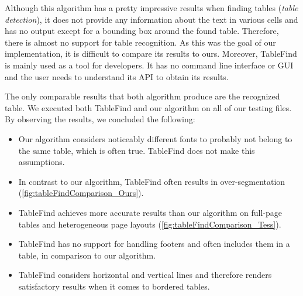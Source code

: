 Although this algorithm has a pretty impressive results when finding tables (\emph{table detection}), it does not provide any information about the text in various cells and has no output except for a bounding box around the found table. Therefore, there is almost no support for table recognition. As this was the goal of our implementation, it is difficult to compare its results to ours. Moreover, TableFind is mainly used as a tool for developers. It has no command line interface or GUI and the user needs to understand its API to obtain its results.

The only comparable results that both algorithm produce are the recognized table. We executed both TableFind and our algorithm on all of our testing files. By observing the results, we concluded the following:
\begin{itemize}
    \item Our algorithm considers noticeably different fonts to probably not belong to the same table, which is often true. TableFind does not make this assumptions.
    \item In contrast to our algorithm, TableFind often results in over-segmentation (\cref{fig:tableFindComparison_Ours}).
    \item TableFind achieves more accurate results than our algorithm on full-page tables and heterogeneous page layouts (\cref{fig:tableFindComparison_Tess}).
    \item TableFind has no support for handling footers and often includes them in a table, in comparison to our algorithm.
    \item TableFind considers horizontal and vertical lines and therefore renders satisfactory results when it comes to bordered tables.
\end{itemize}

